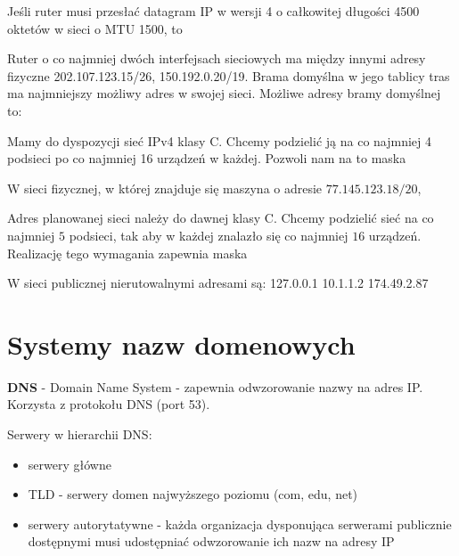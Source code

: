 \begin{problems}
    \prob Jeśli ruter musi przesłać datagram IP w wersji 4 o całkowitej długości 4500 oktetów w sieci o MTU 1500, to

    \prob Ruter o co najmniej dwóch interfejsach sieciowych ma między innymi adresy fizyczne 202.107.123.15/26, 150.192.0.20/19. Brama domyślna w jego tablicy tras ma najmniejszy możliwy adres w swojej sieci. Możliwe adresy bramy domyślnej to:
    
    \prob Mamy do dyspozycji sieć IPv4 klasy C. Chcemy podzielić ją na co najmniej 4 podsieci po co najmniej 16 urządzeń w każdej. Pozwoli nam na to maska

    \prob W sieci fizycznej, w której znajduje się maszyna o adresie $77.145.123.18/20$,

    \prob Adres planowanej sieci należy do dawnej klasy C. Chcemy podzielić sieć na co najmniej $5$ podsieci, tak aby w każdej znalazło się co najmniej $16$ urządzeń. Realizację tego wymagania zapewnia maska

    \prob W sieci publicznej nierutowalnymi adresami są:
    \answers
    {127.0.0.1}
    {10.1.1.2}
    {174.49.2.87}

\end{problems}

\section{Systemy nazw domenowych}

\textbf{DNS} - Domain Name System - zapewnia odwzorowanie nazwy na adres IP. Korzysta z protokołu DNS (port 53).

Serwery w hierarchii DNS:
\begin{itemize}
    \item serwery główne
    \item TLD - serwery domen najwyższego poziomu (com, edu, net)
    \item serwery autorytatywne - każda organizacja dysponująca serwerami publicznie dostępnymi musi udostępniać odwzorowanie ich nazw na adresy IP
\end{itemize}

